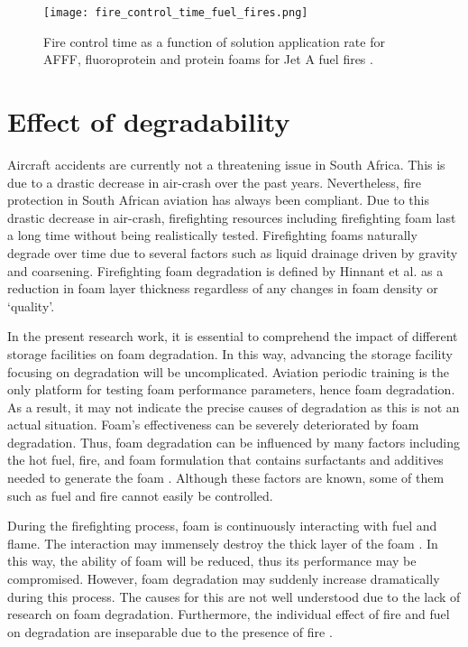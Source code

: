 \begin{figure}[H]
    \centering
    \texttt{[image: fire\_control\_time\_fuel\_fires.png]}
    \caption{Fire control time as a function of solution application rate for AFFF, fluoroprotein and protein foams for Jet A fuel fires \cite{geyer1972evaluation}.}
    \label{ch2:figure:fuel}
\end{figure}

\section{Effect of degradability}
Aircraft accidents are currently not a threatening issue in South Africa. This is due to a drastic decrease in air-crash over the past years. Nevertheless, fire protection in South African aviation has always been compliant. Due to this drastic decrease in air-crash, firefighting resources including firefighting foam last a long time without being realistically tested. Firefighting foams naturally degrade over time due to several factors such as liquid drainage driven by gravity and coarsening. Firefighting foam degradation is defined by Hinnant et al. \cite{hinnant2017influence} as a reduction in foam layer thickness regardless of any changes in foam density or ‘quality’. 

In the present research work, it is essential to comprehend the impact of different storage facilities on foam degradation. In this way, advancing the storage facility focusing on degradation will be uncomplicated. Aviation periodic training is the only platform for testing foam performance parameters, hence foam degradation. As a result, it may not indicate the precise causes of degradation as this is not an actual situation. Foam’s effectiveness can be severely deteriorated by foam degradation. Thus, foam degradation can be influenced by many factors including the hot fuel, fire, and foam formulation that contains surfactants and additives needed to generate the foam \cite{hinnant2017influence}. Although these factors are known, some of them such as fuel and fire cannot easily be controlled.     

During the firefighting process, foam is continuously interacting with fuel and flame. The interaction may immensely destroy the thick layer of the foam \cite{osei2015foam}. In this way, the ability of foam will be reduced, thus its performance may be compromised. However, foam degradation may suddenly increase dramatically during this process.  The causes for this are not well understood due to the lack of research on foam degradation. Furthermore, the individual effect of fire and fuel on degradation are inseparable due to the presence of fire \cite{hinnant2017influence}.  


